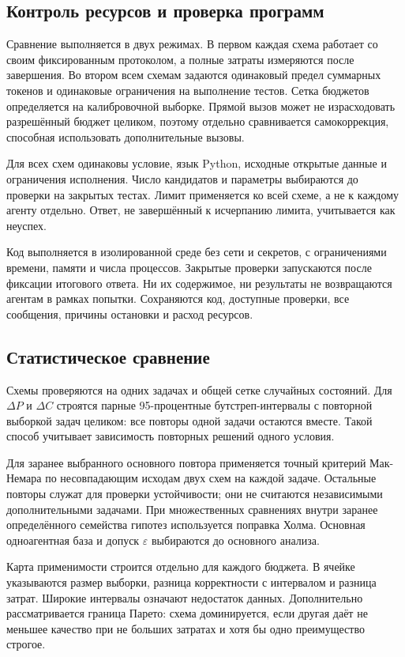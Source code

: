 \documentclass{misisarticle}
\begin{document}
\subsection{Контроль ресурсов и проверка программ}
Сравнение выполняется в двух режимах. В первом каждая схема работает со своим фиксированным протоколом, а полные затраты измеряются после завершения. Во втором всем схемам задаются одинаковый предел суммарных токенов и одинаковые ограничения на выполнение тестов. Сетка бюджетов определяется на калибровочной выборке. Прямой вызов может не израсходовать разрешённый бюджет целиком, поэтому отдельно сравнивается самокоррекция, способная использовать дополнительные вызовы.

Для всех схем одинаковы условие, язык Python, исходные открытые данные и ограничения исполнения. Число кандидатов и параметры выбираются до проверки на закрытых тестах. Лимит применяется ко всей схеме, а не к каждому агенту отдельно. Ответ, не завершённый к исчерпанию лимита, учитывается как неуспех.

Код выполняется в изолированной среде без сети и секретов, с ограничениями времени, памяти и числа процессов. Закрытые проверки запускаются после фиксации итогового ответа. Ни их содержимое, ни результаты не возвращаются агентам в рамках попытки. Сохраняются код, доступные проверки, все сообщения, причины остановки и расход ресурсов.

\subsection{Статистическое сравнение}
Схемы проверяются на одних задачах и общей сетке случайных состояний. Для $\Delta P$ и $\Delta C$ строятся парные 95-процентные бутстреп-интервалы с повторной выборкой задач целиком: все повторы одной задачи остаются вместе. Такой способ учитывает зависимость повторных решений одного условия.

Для заранее выбранного основного повтора применяется точный критерий Мак-Немара по несовпадающим исходам двух схем на каждой задаче. Остальные повторы служат для проверки устойчивости; они не считаются независимыми дополнительными задачами. При множественных сравнениях внутри заранее определённого семейства гипотез используется поправка Холма. Основная одноагентная база и допуск $\varepsilon$ выбираются до основного анализа.

Карта применимости строится отдельно для каждого бюджета. В ячейке указываются размер выборки, разница корректности с интервалом и разница затрат. Широкие интервалы означают недостаток данных. Дополнительно рассматривается граница Парето: схема доминируется, если другая даёт не меньшее качество при не больших затратах и хотя бы одно преимущество строгое.
\end{document}

